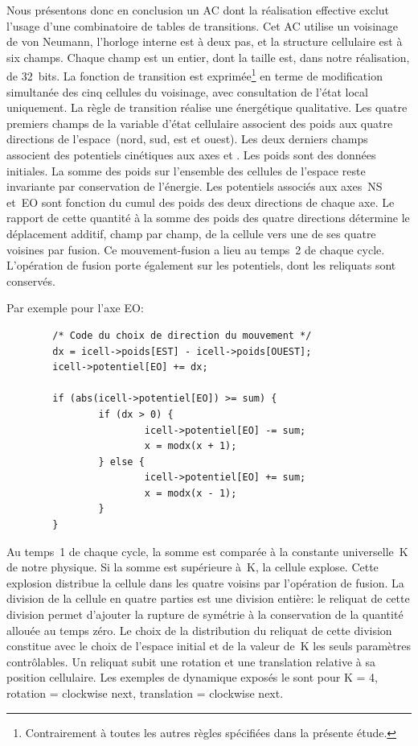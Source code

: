Nous pr\'esentons donc en conclusion un AC dont la r\'ealisation effective
exclut l'usage d'une combinatoire de tables de transitions. %
Cet AC utilise un voisinage de von Neumann, l'horloge interne est \`a
deux pas, et la structure cellulaire est \`a six champs. %
Chaque champ est un entier, dont la taille est, dans notre
r\'ealisation, de 32~bits. %
La fonction de transition est exprim\'ee\footnote{%
  Contrairement \`a toutes les autres r\`egles sp\'ecifi\'ees dans la pr\'esente \'etude.}%
en terme de modification simultan\'ee des cinq cellules du voisinage,
avec consultation de l'\'etat local uniquement. %
La r\`egle de transition r\'ealise une  \'energ\'etique
qualitative. %
Les quatre premiers champs de la variable d'\'etat cellulaire associent
des poids aux quatre directions de l'espace~(nord, sud, est et
ouest). %
Les deux derniers champs associent des potentiels cin\'etiques aux axes
 et . %
Les poids sont des donn\'ees initiales. %
La somme des poids sur l'ensemble des cellules de l'espace reste
invariante par conservation de l'\'energie. %
Les potentiels associ\'es aux axes~NS et~EO sont fonction du cumul des
poids des deux directions de chaque axe. %
Le rapport de cette quantit\'e \`a la somme des poids des quatre
directions d\'etermine le d\'eplacement additif, champ par champ, de la
cellule vers une de ses quatre voisines par fusion. %
Ce mouvement-fusion a lieu au temps~2 de chaque cycle. %
L'op\'eration de fusion porte \'egalement sur les potentiels, dont les
reliquats sont conserv\'es. %

Par exemple pour l'axe EO:

\footnotesize
\begin{verbatim}
        /* Code du choix de direction du mouvement */
        dx = icell->poids[EST] - icell->poids[OUEST];
        icell->potentiel[EO] += dx;

        if (abs(icell->potentiel[EO]) >= sum) {
                if (dx > 0) {
                        icell->potentiel[EO] -= sum;
                        x = modx(x + 1);
                } else {
                        icell->potentiel[EO] += sum;
                        x = modx(x - 1);
                }
        }
\end{verbatim}
\normalsize

Au temps~1 de chaque cycle, la somme est compar\'ee \`a la constante
universelle~K de notre physique. %
Si la somme est sup\'erieure \`a~K, la cellule explose. %
Cette explosion distribue la cellule dans les quatre voisins par
l'op\'eration de fusion. %
La division de la cellule en quatre parties est une division enti\`ere:
le reliquat de cette division permet d'ajouter la rupture de sym\'etrie
\`a la conservation de la quantit\'e allou\'ee au temps z\'ero. %
Le choix de la distribution du reliquat de cette division constitue
avec le choix de l'espace initial et de la valeur de~K les seuls
param\`etres contr\^olables. %
Un reliquat subit une rotation et une translation relative \`a sa
position cellulaire. %
Les exemples de dynamique expos\'es le sont
pour K = 4, rotation = clockwise next, translation = clockwise next. %


